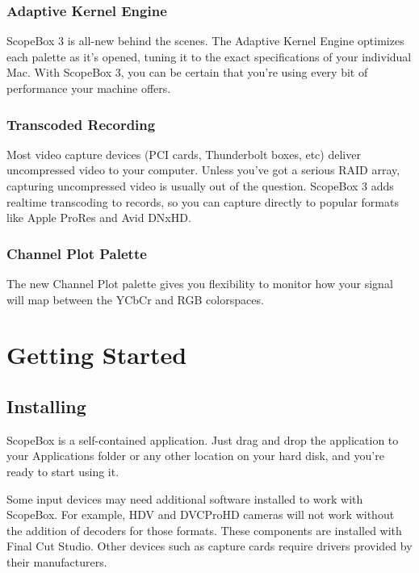 \documentclass[10,letterpaper,]{report}
\begin{document}
\subsection{Adaptive Kernel Engine}

ScopeBox 3 is all-new behind the scenes. The Adaptive Kernel Engine
optimizes each palette as it's opened, tuning it to the exact
specifications of your individual Mac. With ScopeBox 3, you can be
certain that you're using every bit of performance your machine offers.

\subsection{Transcoded Recording}

Most video capture devices (PCI cards, Thunderbolt boxes, etc) deliver
uncompressed video to your computer. Unless you've got a serious RAID
array, capturing uncompressed video is usually out of the question.
ScopeBox 3 adds realtime transcoding to records, so you can capture
directly to popular formats like Apple ProRes and Avid DNxHD.

\subsection{Channel Plot Palette}

The new Channel Plot palette gives you flexibility to monitor how your
signal will map between the YCbCr and RGB colorspaces.

\chapter{Getting Started}

\section{Installing}

ScopeBox is a self-contained application. Just drag and drop the
application to your Applications folder or any other location on your
hard disk, and you're ready to start using it.

Some input devices may need additional software installed to work with
ScopeBox. For example, HDV and DVCProHD cameras will not work without
the addition of decoders for those formats. These components are
installed with Final Cut Studio. Other devices such as capture cards
require drivers provided by their manufacturers.
\end{document}
